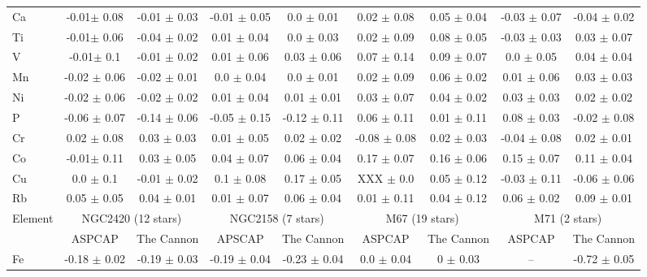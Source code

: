 \documentclass[14pt, preprint2]{aastex6}
\begin{document}
\begin{table}[!h]
\begin{tabular}{ | p{} | c| c | c | c | c | c | c | c | }
Ca & -0.01$\pm$ 0.08 & -0.01 $\pm$ 0.03 & -0.01 $\pm$ 0.05  & 0.0 $\pm$ 0.01 & 0.02 $\pm$ 0.08 & 0.05 $\pm$ 0.04 &  -0.03 $\pm$ 0.07 & -0.04 $\pm$ 0.02 \\
Ti & -0.01$\pm$ 0.06 & -0.04 $\pm$ 0.02 & 0.01 $\pm$ 0.04  & 0.0 $\pm$ 0.03 & 0.02 $\pm$ 0.09 & 0.08 $\pm$ 0.05 &  -0.03 $\pm$ 0.03 & 0.03 $\pm$ 0.07 \\
V & -0.01$\pm$ 0.1 &  -0.01 $\pm$ 0.02 & 0.01 $\pm$ 0.06 & 0.03 $\pm$ 0.06 & 0.07 $\pm$ 0.14 & 0.09 $\pm$ 0.07 & 0.0 $\pm$ 0.05  & 0.04 $\pm$ 0.04 \\
Mn & -0.02 $\pm$ 0.06 & -0.02 $\pm$ 0.01  &  0.0 $\pm$ 0.04 & 0.0 $\pm$ 0.01 & 0.02 $\pm$ 0.09 & 0.06 $\pm$ 0.02 & 0.01 $\pm$ 0.06  & 0.03 $\pm$ 0.03 \\
Ni & -0.02 $\pm$ 0.06 & -0.02 $\pm$ 0.02  &  0.01 $\pm$ 0.04 & 0.01 $\pm$ 0.01 & 0.03 $\pm$ 0.07 & 0.04 $\pm$ 0.02 & 0.03 $\pm$ 0.03  & 0.02 $\pm$ 0.02 \\
P & -0.06 $\pm$ 0.07 &  -0.14 $\pm$ 0.06  & -0.05 $\pm$ 0.15 & -0.12 $\pm$ 0.11 & 0.06 $\pm$ 0.11 & 0.01 $\pm$ 0.11 & 0.08 $\pm$ 0.03  & -0.02 $\pm$ 0.08 \\
Cr & 0.02 $\pm$ 0.08 &  0.03 $\pm$ 0.03 &  0.01 $\pm$ 0.05 & 0.02 $\pm$ 0.02 & -0.08 $\pm$ 0.08 &0.02 $\pm$ 0.03 & -0.04 $\pm$ 0.08  &  0.02 $\pm$ 0.01 \\
Co & -0.01$\pm$ 0.11 & 0.03 $\pm$ 0.05 &  0.04 $\pm$ 0.07 & 0.06 $\pm$ 0.04 & 0.17 $\pm$ 0.07 & 0.16 $\pm$ 0.06 &  0.15 $\pm$ 0.07 &  0.11 $\pm$ 0.04 \\
Cu &  0.0 $\pm$ 0.1 & -0.01 $\pm$ 0.02 & 0.1 $\pm$ 0.08 & 0.17 $\pm$ 0.05 & XXX $\pm$ 0.0 & 0.05 $\pm$ 0.12 &  -0.03 $\pm$ 0.11 & -0.06 $\pm$ 0.06 \\
Rb & 0.05 $\pm$ 0.05 & 0.04 $\pm$ 0.01  &  0.01 $\pm$ 0.07 & 0.06 $\pm$ 0.04 & 0.01 $\pm$ 0.11 & 0.04 $\pm$ 0.12 & 0.06 $\pm$ 0.02  & 0.09 $\pm$ 0.01 \\
 \hline
\multicolumn{1}{|c|}{Element}& \multicolumn{2}{|c|}{ NGC2420 (12 stars)} & \multicolumn{2}{|c|}{NGC2158 (7 stars)}  & \multicolumn{2}{|c|}{M67 (19 stars)} & \multicolumn{2}{|c|}{M71 (2 stars) }  \\
\hline
 &  ASPCAP & The Cannon & APSCAP & The Cannon & ASPCAP & The Cannon & ASPCAP  &  The Cannon \\
 \hline
Fe & -0.18 $\pm$ 0.02 & -0.19 $\pm$ 0.03 &  -0.19 $\pm$ 0.04  & -0.23 $\pm$ 0.04 &  0.0 $\pm$ 0.04 &0 $\pm$ 0.03 & -- & -0.72 $\pm$ 0.05 \\

\end{tabular}
\end{table}
\end{document}
